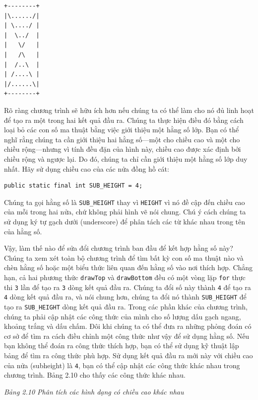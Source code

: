 \begin{verbatim}
+--------+ 
|\....../| 
| \..../ | 
|  \../  | 
|   \/   | 
|   /\   | 
|  /..\  | 
| /....\ | 
|/......\| 
+--------+ 
\end{verbatim}

Rõ ràng chương trình sẽ hữu ích hơn nếu chúng ta có thể làm cho nó đủ
linh hoạt để tạo ra một trong hai kết quả đầu ra. Chúng ta thực hiện
điều đó bằng cách loại bỏ các con số ma thuật bằng việc giới thiệu một
hằng số lớp. Bạn có thể nghĩ rằng chúng ta cần giới thiệu hai hằng
số---một cho chiều cao và một cho chiều rộng---nhưng vì tính đều đặn của
hình này, chiều cao được xác định bởi chiều rộng và ngược lại. Do đó,
chúng ta chỉ cần giới thiệu một hằng số lớp duy nhất. Hãy sử dụng chiều
cao của các nửa đồng hồ cát:

\begin{verbatim}
public static final int SUB_HEIGHT = 4;
\end{verbatim}

Chúng ta gọi hằng số là \texttt{SUB\_HEIGHT} thay vì \texttt{HEIGHT} vì
nó đề cập đến chiều cao của mỗi trong hai nửa, chứ không phải hình vẽ
nói chung. Chú ý cách chúng ta sử dụng ký tự gạch dưới (underscore) để
phân tách các từ khác nhau trong tên của hằng số.

Vậy, làm thế nào để sửa đổi chương trình ban đầu để kết hợp hằng số này?
Chúng ta xem xét toàn bộ chương trình để tìm bất kỳ con số ma thuật nào
và chèn hằng số hoặc một biểu thức liên quan đến hằng số vào nơi thích
hợp. Chẳng hạn, cả hai phương thức \texttt{drawTop} và
\texttt{drawBottom} đều có một vòng lặp \texttt{for} thực thi \texttt{3}
lần để tạo ra \texttt{3} dòng kết quả đầu ra. Chúng ta đổi số này thành
\texttt{4} để tạo ra \texttt{4} dòng kết quả đầu ra, và nói chung hơn,
chúng ta đổi nó thành \texttt{SUB\_HEIGHT} để tạo ra
\texttt{SUB\_HEIGHT} dòng kết quả đầu ra. Trong các phần khác của chương
trình, chúng ta phải cập nhật các công thức của mình cho số lượng dấu
gạch ngang, khoảng trắng và dấu chấm. Đôi khi chúng ta có thể đưa ra
những phỏng đoán có cơ sở để tìm ra cách điều chỉnh một công thức như
vậy để sử dụng hằng số. Nếu bạn không thể đoán ra công thức thích hợp,
bạn có thể sử dụng kỹ thuật lập bảng để tìm ra công thức phù hợp. Sử
dụng kết quả đầu ra mới này với chiều cao của nửa (subheight) là
\texttt{4}, bạn có thể cập nhật các công thức khác nhau trong chương
trình. Bảng 2.10 cho thấy các công thức khác nhau.

\emph{Bảng 2.10 Phân tích các hình dạng có chiều cao khác nhau}

